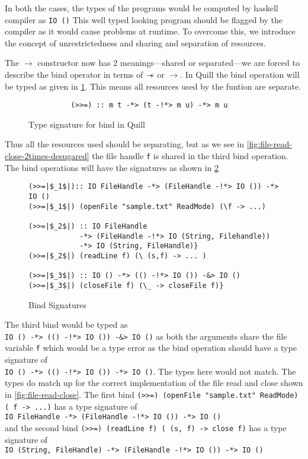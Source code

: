 In both the cases, the types of the programs would be computed by haskell compiler as \texttt{IO ()}
This well typed looking program should be flagged by the compiler as it would cause problems at runtime.
To overcome this, we introduce the concept of unrestrictedness and sharing and separation of resources.

The $\rightarrow$ constructor now has 2 meanings---shared or separated---we are
forced to describe the bind operator in terms of $\mathrel{-\mkern-6mu*}$ or $\rightarrow$. In Quill the bind operation will
be typed as given in \cref{fig:quill-bind-type}. This means all resources used by the funtion are separate.
\begin{figure}[h]
  \begin{framed}
    \begin{verbatim}
          (>>=) :: m t -*> (t -!*> m u) -*> m u
    \end{verbatim}
  \end{framed}
  \caption{Type signature for bind in Quill}
  \label{fig:quill-bind-type}
\end{figure}
Thus all the resources used should be separating, but as we see in \cref{fig:file-read-close-2times-desugared} the file handle
\texttt{f} is shared in the third bind operation.
The bind operations will have the signatures as shown in \cref{fig:bind-signatures}
\begin{figure}[h]
\begin{framed}
\begin{verbatim}
(>>=|$_1$|):: IO FileHandle -*> (FileHandle -!*> IO ()) -*> IO ()
(>>=|$_1$|) (openFile "sample.txt" ReadMode) (\f -> ...)

(>>=|$_2$|) :: IO FileHandle
            -*> (FileHandle -!*> IO (String, Filehandle))
            -*> IO (String, FileHandle)}
(>>=|$_2$|) (readLine f) (\ (s,f) -> ... )

(>>=|$_3$|) :: IO () -*> (() -!*> IO ()) -&> IO ()
(>>=|$_3$|) (closeFile f) (\_ -> closeFile f)}
\end{verbatim}
\end{framed}
\caption{Bind Signatures}
\label{fig:bind-signatures}
\end{figure}

The third bind would be typed as\\
\texttt{IO () -*> (() -!*> IO ()) -&> IO ()} as both the arguments share the file variable \texttt{f}
which would be a type error
as the bind operation should have a type signature of\\
\texttt{IO () -*> (() -!*> IO ()) -*> IO ()}. The types here would not match.
The types do match up for the correct implementation of the file read and close shown in \cref{fig:file-read-close}.
The first bind \texttt{(>>=) (openFile "sample.txt" ReadMode) (\ f -> ...)} has a type signature of\\
\texttt{IO FileHandle -*> (FileHandle -!*> IO ()) -*> IO ()}\\ and the second bind
\texttt{(>>=) (readLine f) (\ (s, f) -> close f)} has a type signature of\\
\texttt{IO (String, FileHandle) -*> (FileHandle -!*> IO ()) -*> IO ()}


